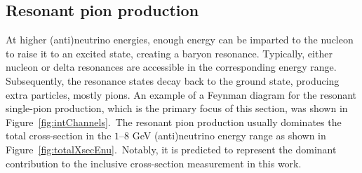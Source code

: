 \subsection{Resonant pion production}

At higher (anti)neutrino energies, enough energy can be imparted to the nucleon to raise it to an excited state, creating a baryon resonance. Typically, either nucleon or delta resonances are accessible in the corresponding energy range.
Subsequently, the resonance states decay back to the ground state, producing extra particles, mostly pions. An example of a Feynman diagram for the resonant single-pion production, which is the primary focus of this section, was shown in Figure~\ref{fig:intChannels}.~The resonant pion production usually dominates the total cross-section in the $1$--$8$ GeV (anti)neutrino energy range as shown in Figure~\ref{fig:totalXsecEnu}.~Notably, it is predicted to represent the dominant contribution to the inclusive cross-section measurement in this work. 

